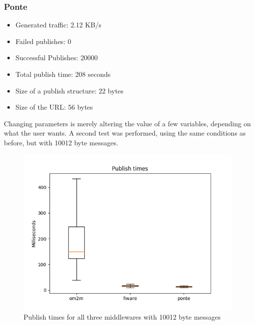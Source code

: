 \documentclass[conference]{IEEEtran}
\begin{document}
\subsubsection{Ponte}
\begin{itemize}
\item Generated traffic: 2.12 KB/s
\item Failed publishes: 0
\item Successful Publishes: 20000
\item Total publish time: 208 seconds
\item Size of a publish structure: 22 bytes
\item Size of the URL: 56 bytes
\end{itemize}

Changing parameters is merely altering the value of a few variables, depending on what the user wants. A second test was performed, using the same conditions as before, but with 10012 byte messages.

\begin{figure}[htbp!]
  \centering
  \includegraphics[width=\columnwidth]{figures/om2m_fiware_ponte_publish_times_10000.png}
  \caption{Publish times for all three middlewares with 10012 byte messages}
  \label{fig:publish_times_10000}
\end{figure}
\end{document}
